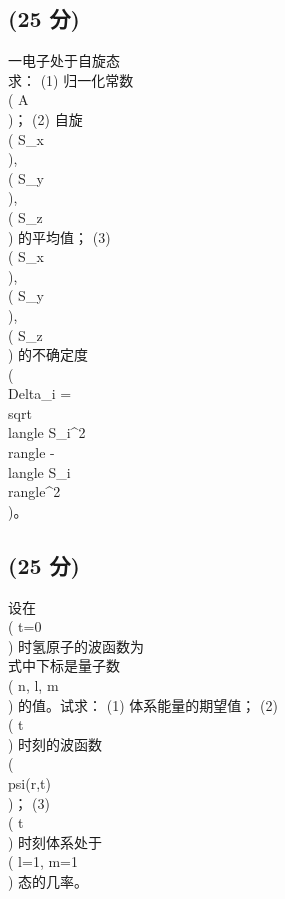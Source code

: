 \subsection{(25 分)}
一电子处于自旋态
\\[\\chi = A\\begin{pmatrix}3i \\\\4\\end{pmatrix},\\]
求：
(1) 归一化常数 \\( A \\)；
(2) 自旋 \\( S_x \\), \\( S_y \\), \\( S_z \\) 的平均值；
(3) \\( S_x \\), \\( S_y \\), \\( S_z \\) 的不确定度 \\(\\Delta_i = \\sqrt{\\langle S_i^2 \\rangle - \\langle S_i \\rangle^2}\\)。

\subsection{(25 分)}
设在 \\( t=0 \\) 时氢原子的波函数为
\\[\\psi(r, 0) = \\frac{1}{3} \\left( \\psi_{100} + \\psi_{210} + 2 \\psi_{211} + \\sqrt{3} \\psi_{21-1} \\right)\\]
式中下标是量子数 \\( n, l, m \\) 的值。试求：
(1) 体系能量的期望值；
(2) \\( t \\) 时刻的波函数 \\( \\psi(r,t) \\)；
(3) \\( t \\) 时刻体系处于 \\( l=1, m=1 \\) 态的几率。

